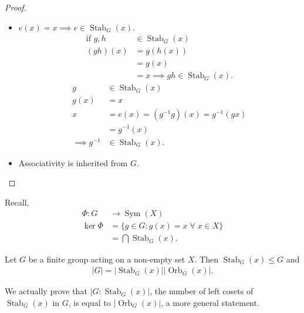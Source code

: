 \begin{proof} ~
    \begin{itemize} 
        \item $e(x) = x \implies e \in \operatorname{Stab}_G(x)$.
        \mathitem
        \begin{align*}
            \text{if } g, h &\in \operatorname{Stab}_G(x) \\
            (gh)(x) &= g(h(x)) \\
            &= g(x) \\
            &= x \implies gh \in \operatorname{Stab}_G(x).
            \end{align*} 
        \mathitem
        \begin{align*}
            g &\in \operatorname{Stab}_G(x) \\
            g(x) &= x \\
            x &= e(x) = (g^{-1} g)(x) = g^{-1}(gx) \\
            &= g^{-1}(x) \\
            \implies g^{-1} &\in \operatorname{Stab}_G(x).
        \end{align*} 
        \item Associativity is inherited from $G$.
    \end{itemize} 
\end{proof} 

\begin{remark} 
    Recall,  \begin{align*}
        \Phi : G &\to \operatorname{Sym}(X) \\
        \ker \Phi &= \{ g \in G : g(x) = x \; \forall \; x \in X \} \\
        &= \bigcap \operatorname{Stab}_G(x).
    \end{align*}
\end{remark} 

\begin{theorem} \label{thm:orbit}
    Let $G$ be a finite group acting on a non-empty set $X$.
    Then $\operatorname{Stab}_G(x) \leq G$ and 
    \begin{align*}
        |G| = |\operatorname{Stab}_G(x)| |\operatorname{Orb}_G(x)|.
    \end{align*} 
\end{theorem} 

\begin{remark}
    We actually prove that $|G : \operatorname{Stab}_G(x)|$, the number of left cosets of $\operatorname{Stab}_G(x)$ in $G$, is equal to $|\operatorname{Orb}_G(x)|$, a more general statement.
\end{remark} 

